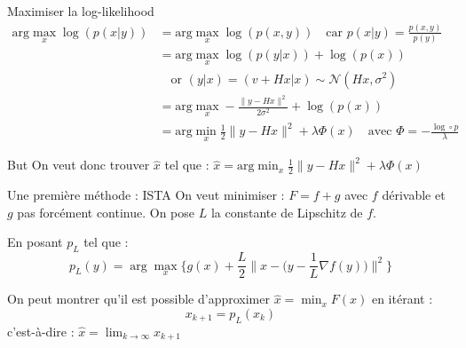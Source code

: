 \documentclass[11pt]{beamer}
\begin{document}
\begin{frame}{Maximiser la log-likelihood}
        \begin{align*}
            \text{arg} \max_x \log(p(x|y)) &= \text{arg} \max_x \log(p(x, y)) \quad \text{car } p(x|y) = \frac{p(x, y)}{p(y)} \\
            &= \text{arg} \max_x \log(p(y|x)) + \log(p(x)) \\
            &\quad \text{or } (y|x) = (v+Hx|x) \sim \mathcal{N}(Hx, \sigma^2) \\
            &= \text{arg} \max_x -\frac{\lVert y-Hx \rVert ^2}{2 \sigma^2} + \log(p(x)) \\
            &= \text{arg} \min_x \frac{1}{2}\lVert y-Hx \rVert ^2 + \lambda \Phi(x) \quad \text{avec } \Phi = -\frac{\log \circ p}{\lambda}
        \end{align*}

        \begin{alertblock}{But}
            On veut donc trouver $\hat{x}$ tel que : $\hat{x} = \text{arg} \displaystyle \min_x \frac{1}{2} \lVert y-Hx \rVert ^2 + \lambda \Phi(x)$
        \end{alertblock}
\end{frame}

\begin{frame}{Une première méthode : ISTA}
    On veut minimiser : $F = f + g$ avec $f$ dérivable et $g$ pas forcément continue.
    On pose $L$ la constante de Lipschitz de $f$.

    En posant $p_L$ tel que : $$ p_L(y) = \arg \max_x \Bigg\{ g(x) + \frac{L}{2} \Big\lVert x - \Big(y - \frac{1}{L} \nabla f(y)\Big) \Big\rVert ^2 \Bigg\}$$

    On peut montrer qu'il est possible d'approximer $\hat{x} = \displaystyle \min_x F(x)$ en itérant :
    $$x_{k+1} = p_L(x_k)$$
    c'est-à-dire : $\hat{x} = \displaystyle \lim_{k \rightarrow \infty} x_{k+1}$

\end{frame}
\end{document}
